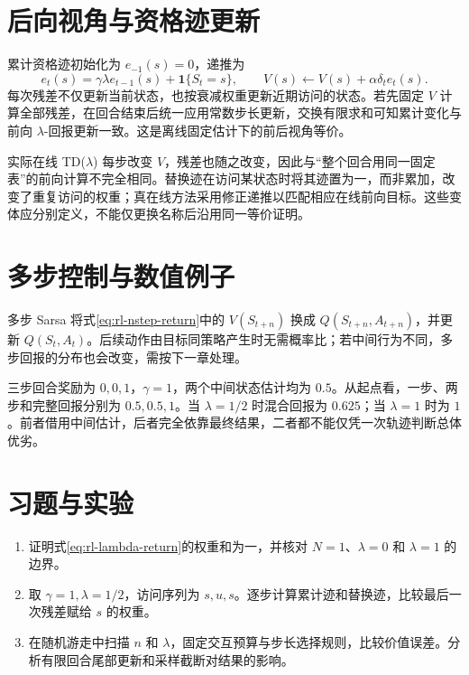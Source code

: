 \section{后向视角与资格迹更新}

累计资格迹初始化为 $e_{-1}(s)=0$，递推为
\[
e_t(s)=\gamma\lambda e_{t-1}(s)+\mathbf1\{S_t=s\},\qquad
V(s)\leftarrow V(s)+\alpha\delta_t e_t(s).
\]
每次残差不仅更新当前状态，也按衰减权重更新近期访问的状态。若先固定 $V$ 计算全部残差，在回合结束后统一应用常数步长更新，交换有限求和可知累计变化与前向 $\lambda$-回报更新一致。这是离线固定估计下的前后视角等价。

实际在线 TD($\lambda$) 每步改变 $V$，残差也随之改变，因此与“整个回合用同一固定表”的前向计算不完全相同。替换迹在访问某状态时将其迹置为一，而非累加，改变了重复访问的权重；真在线方法采用修正递推以匹配相应在线前向目标。这些变体应分别定义，不能仅更换名称后沿用同一等价证明。

\section{多步控制与数值例子}

多步 Sarsa 将式\eqref{eq:rl-nstep-return}中的 $V(S_{t+n})$ 换成 $Q(S_{t+n},A_{t+n})$，并更新 $Q(S_t,A_t)$。后续动作由目标同策略产生时无需概率比；若中间行为不同，多步回报的分布也会改变，需按下一章处理。

\begin{example}[混合三种时间跨度]
三步回合奖励为 $0,0,1$，$\gamma=1$，两个中间状态估计均为 $0.5$。从起点看，一步、两步和完整回报分别为 $0.5,0.5,1$。当 $\lambda=1/2$ 时混合回报为 $0.625$；当 $\lambda=1$ 时为 $1$。前者借用中间估计，后者完全依靠最终结果，二者都不能仅凭一次轨迹判断总体优劣。
\end{example}

\section{习题与实验}
\begin{enumerate}
\item 证明式\eqref{eq:rl-lambda-return}的权重和为一，并核对 $N=1$、$\lambda=0$ 和 $\lambda=1$ 的边界。
\item 取 $\gamma=1,\lambda=1/2$，访问序列为 $s,u,s$。逐步计算累计迹和替换迹，比较最后一次残差赋给 $s$ 的权重。
\item 在随机游走中扫描 $n$ 和 $\lambda$，固定交互预算与步长选择规则，比较价值误差。分析有限回合尾部更新和采样截断对结果的影响。
\end{enumerate}





